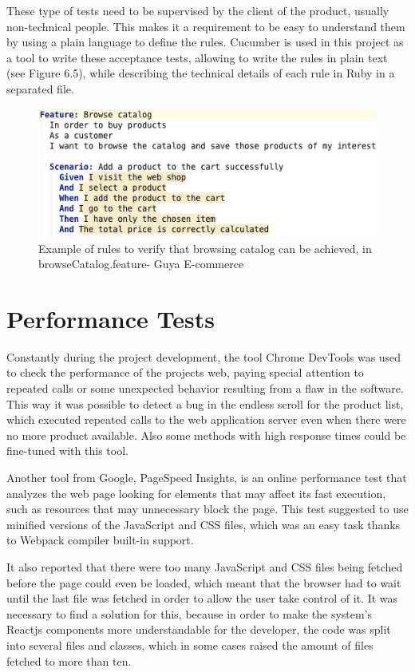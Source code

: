 These type of tests need to be supervised by the client of the product, usually non-technical people. This makes it a requirement to be easy to understand them by using a plain language to define the rules. Cucumber is used in this project as a tool to write these acceptance tests, allowing to write the rules in plain text (see Figure 6.5), while describing the technical details of each rule in Ruby in a separated file.

\begin{figure}[!h]
\center
\includegraphics[keepaspectratio, width=12cm]{images/browse-catalog-testing-rules.png}
\caption{Example of rules to verify that browsing catalog can be achieved, in browseCatalog.feature- Guya E-commerce}
\end{figure}


\section{Performance Tests}

Constantly during the project development, the tool Chrome DevTools was used to check the performance of the projects web, paying special attention to repeated calls or some unexpected behavior resulting from a flaw in the software. This way it was possible to detect a bug in the endless scroll for the product list, which executed repeated calls to the web application server even when there were no more product available. Also some methods with high response times could be fine-tuned with this tool.

Another tool from Google, PageSpeed Insights, is an online performance test that analyzes the web page looking for elements that may affect its fast execution, such as resources that may unnecessary block the page. This test suggested to use minified versions of the JavaScript and CSS files, which was an easy task thanks to Webpack compiler built-in support.

It also reported that there were too many JavaScript and CSS files being fetched before the page could even be loaded, which meant that the browser had to wait until the last file was fetched in order to allow the user take control of it. It was necessary to find a solution for this, because in order to make the system’s Reactjs components more understandable for the developer, the code was split into several files and classes, which in some cases raised the amount of files fetched to more than ten.

